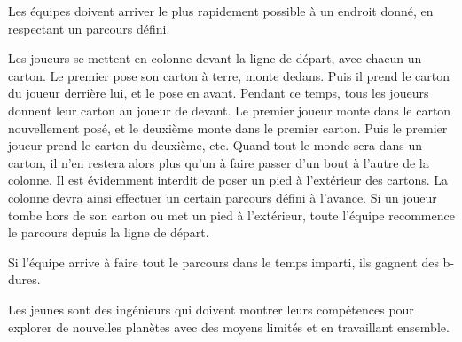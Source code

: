 \documentclass{grand-jeu}
\begin{document}
\begin{liste-materiel}
\end{liste-materiel}

\begin{regles}
Les équipes doivent arriver le plus rapidement possible à un endroit donné, en respectant un parcours défini.

Les joueurs se mettent en colonne devant la ligne de départ, avec chacun un carton. Le premier pose son carton à terre, monte dedans. Puis il prend le carton du joueur derrière lui, et le pose en avant. Pendant ce temps, tous les joueurs donnent leur carton au joueur de devant. Le premier joueur monte dans le carton nouvellement posé, et le deuxième monte dans le premier carton. Puis le premier joueur prend le carton du deuxième, etc. Quand tout le monde sera dans un carton, il n’en restera alors plus qu’un à faire passer d’un bout à l’autre de la colonne. Il est évidemment interdit de poser un pied à l’extérieur des cartons. La colonne devra ainsi effectuer un certain parcours défini à l’avance. Si un joueur tombe hors de son carton ou met un pied à l’extérieur, toute l’équipe recommence le parcours depuis la ligne de départ.

Si l'équipe arrive à faire tout le parcours dans le temps imparti, ils gagnent des b-dures.
\end{regles}

\begin{imaginaire}
Les jeunes sont des ingénieurs qui doivent montrer leurs compétences pour explorer de nouvelles planètes avec des moyens limités et en travaillant ensemble.
\end{imaginaire}

\begin{moments-stop}
\end{moments-stop}
\end{document}
